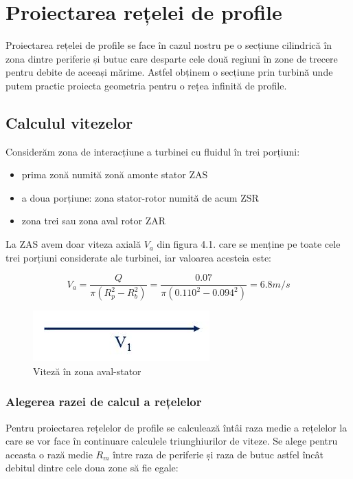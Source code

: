\chapter{Proiectarea rețelei de profile} \label{chapter:proiectarea}

Proiectarea rețelei de profile se face în cazul nostru pe o secțiune cilindrică în zona dintre periferie și butuc care desparte cele două regiuni în zone de trecere pentru debite de aceeași mărime. Astfel obținem o secțiune prin turbină unde putem practic proiecta geometria pentru o rețea infinită de profile.

\section{Calculul vitezelor}

Considerăm zona de interacțiune a turbinei cu fluidul în trei porțiuni:
\begin{itemize}
	\item prima zonă numită zonă amonte stator ZAS
	\item a doua porțiune: zona stator-rotor numită de acum ZSR
	\item zona trei sau zona aval rotor ZAR
\end{itemize}

La ZAS avem doar viteza axială $V_{a}$ din figura 4.1. care se menține pe toate cele trei porțiuni considerate ale turbinei, iar valoarea acesteia este:

\begin{equation}
V_a=\frac{Q}{\pi(R_{p}^2 - R_{b}^2)} = \frac{0.07}{\pi(0.110^2 - 0.094^2)} = 6.8\si{m/s}
\end{equation}

\begin{figure}[h!]
	\centering
	\includegraphics[scale=0.55]{figures/triunghi_viteza_ZAS.jpg}
	\caption{Viteză în zona aval-stator}
	\label{Viteză în zona aval-stator}
\end{figure}

\subsection{Alegerea razei de calcul a rețelelor}

Pentru proiectarea rețelelor de profile se calculează întâi raza medie a rețelelor la care se vor face în continuare calculele triunghiurilor de viteze. Se alege pentru aceasta o rază medie $R_m$ între raza de periferie și raza de butuc astfel încât debitul dintre cele doua zone să fie egale:

